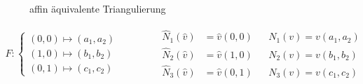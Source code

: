 \begin{beispiel}\

\begin{figure}[h!]
\begin{center}

\caption{affin äquivalente Triangulierung}
\label{AbbAffinEquivTriang}
\end{center}
\end{figure}

\begin{align*}
F:\left\lbrace\begin{array}{l}
(0,0)\mapsto(a_1,a_2)\\
(1,0)\mapsto(b_1,b_2)\\
(0,1)\mapsto(c_1,c_2)
\end{array}\right.
\qquad\qquad
\begin{matrix}
\hat{N}_1(\hat{v})&=\hat{v}(0,0) &&N_1(v)=v(a_1,a_2)\\
\hat{N}_2(\hat{v})&=\hat{v}(1,0) &&N_2(v)=v(b_1,b_2)\\
\hat{N}_3(\hat{v})&=\hat{v}(0,1) &&N_3(v)=v(c_1,c_2)
\end{matrix}
\end{align*}
\end{beispiel}
